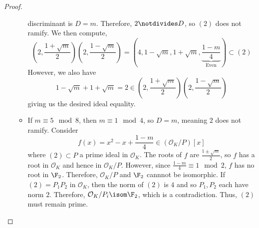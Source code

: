 \documentclass[11pt,leqno,oneside]{amsart}
\numberwithin{thm}{section}
\renewcommand{\O}{\mathcal{O}}
\begin{document}
\begin{proof}
\begin{itemize}
\begin{itemize}
      discriminant is \(D = m\). Therefore, \(2 \notdivides D\), so
      \((2)\) does not ramify. We then compute, \[
        (2,\frac{1+\sqrt{m}}{2})(2,\frac{1-\sqrt{m}}{2}) =
        (4,1-\sqrt{m},1+\sqrt{m},
        \underbrace{\frac{1-m}{4}}_{\text{Even}}) \subset (2)
      \]
      However, we also have \[
        1-\sqrt{m} + 1+\sqrt{m} = 2 \in
        (2,\frac{1+\sqrt{m}}{2})(2,\frac{1-\sqrt{m}}{2}) 
      \]
      giving us the desired ideal equality.
    \item If \(m \equiv 5 \mod 8\), then \(m
      \equiv 1 \mod 4\), so \(D 
      = m\), meaning \(2\) does not ramify. Consider \[
        f(x) = x^2-x+\frac{1-m}{4} \in (\O_K/P)[x]
      \]
      where \((2) \subset P\) a prime ideal in \(\O_K\). The roots of
      \(f\) are \(\frac{1\pm\sqrt{m}}{2}\), so \(f\) has a root in
      \(\O_K\) and hence in \(\O_K/P\). However, since \(\frac{1-m}{4}
      \equiv 1 \mod 2\), \(f\) has no root in \(\F_2\). Therefore,
      \(\O_K/P\) and \(\F_2\) cannnot be isomorphic. If \((2) =
      P_1P_2\) in \(\O_K\), then the norm of \((2)\) is \(4\) and so
      \(P_1,P_2\) each have norm \(2\). Therefore, \(\O_K/P_i \isom
      \F_2\), which is a contradiction. Thus, \((2)\) must remain prime.
    \end{itemize}
  \end{itemize}
\end{proof}
\begin{bibdiv}
  \begin{biblist}
  \end{biblist}
\end{bibdiv}
\end{document}
